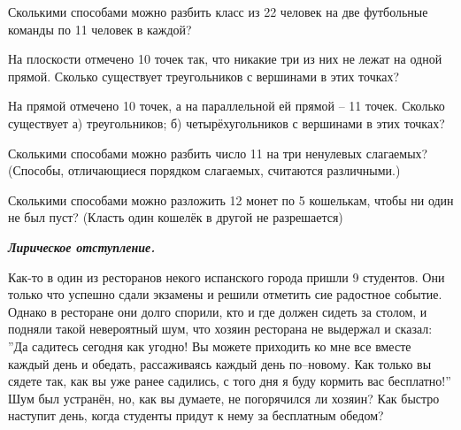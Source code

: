 \begin{ex}
    Сколькими способами можно разбить класс из 22 человек на две футбольные команды по 11 человек в каждой?
\end{ex}

\begin{ex}
    На плоскости отмечено 10 точек так, что никакие три из них не лежат на одной прямой. Сколько существует треугольников с вершинами в этих точках?
\end{ex}

\begin{ex}
    На прямой отмечено 10 точек, а на параллельной ей прямой – 11 точек. Сколько существует а) треугольников; б) четырёхугольников с вершинами в этих точках?
\end{ex}

\begin{ex}
    Сколькими способами можно разбить число 11 на три ненулевых слагаемых? (Способы, отличающиеся порядком слагаемых, считаются различными.)
\end{ex}

\begin{ex}
    Сколькими способами можно разложить 12 монет по 5 кошелькам, чтобы ни один не был пуст? (Класть один кошелёк в другой не разрешается)
\end{ex}

\centerline{\textit{\textbf{Лирическое отступление.}}}

Как-то в один из ресторанов некого испанского города пришли 9 студентов. Они только что успешно сдали экзамены и решили отметить сие радостное событие. Однако в ресторане они долго спорили, кто и где должен сидеть за столом, и подняли такой невероятный шум, что хозяин ресторана не выдержал и сказал: ''Да садитесь сегодня как угодно! Вы можете приходить ко мне все вместе каждый день и обедать, рассаживаясь каждый день по--новому. Как только вы сядете так, как вы уже ранее садились, с того дня я буду кормить вас бесплатно!'' Шум был устранён, но, как вы думаете, не погорячился ли хозяин? Как быстро наступит день, когда студенты придут к нему за бесплатным обедом?